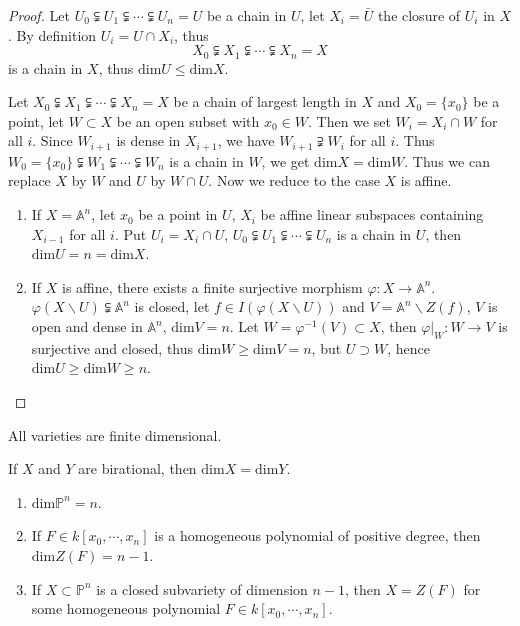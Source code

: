 \begin{proof}
	Let $ U_0\subsetneqq U_1\subsetneqq \cdots\subsetneqq U_n=U $ be a chain in $ U $, let $ X_i=\bar{U} $ the closure of $ U_i $ in $ X $. By definition $ U_i=U\cap X_i $, thus
	$$
		X_0\subsetneqq X_1\subsetneqq \cdots \subsetneqq  X_n=X
	$$
	is a chain in $ X $, thus $ \mathrm{dim}U\leq \mathrm{dim}X $.

	Let $ X_0\subsetneqq X_1\subsetneqq \cdots\subsetneqq X_n=X $ be a chain of largest length in $ X $ and $ X_0=\lbrace x_0\rbrace $ be a point, let $ W\subset X $ be an open subset with $ x_0\in W $. Then we set $ W_i=X_i\cap W $ for all $ i $. Since $ W_{i+1} $ is dense in $ X_{i+1} $, we have $ W_{i+1}\supsetneqq W_i $ for all $ i $. Thus $ W_0=\lbrace x_0\rbrace\subsetneqq W_1\subsetneqq \cdots\subsetneqq W_n $ is a chain in $ W $, we get $ \mathrm{dim}X=\mathrm{dim}W $. Thus we can replace $ X $ by $ W $ and $ U $ by $ W\cap U $. Now we reduce to the case $ X $ is affine.
	\begin{enumerate}
		\item If $ X=\mathbb{A}^n $, let $ x_0 $ be a point in $ U $, $ X_i $ be affine linear subspaces containing $ X_{i-1} $ for all $ i $. Put $ U_i=X_i\cap U $,  $ U_0\subsetneqq U_1\subsetneqq \cdots\subsetneqq U_n $ is a chain in $ U $, then $ \mathrm{dim}U=n=\mathrm{dim}X $.
		\item If $ X $ is affine, there exists a finite surjective morphism $ \varphi:X\to \mathbb{A}^n $. $ \varphi(X\backslash U)\subsetneqq \mathbb{A}^n $ is closed, let $ f\in I(\varphi(X\backslash U)) $ and $ V=\mathbb{A}^n\backslash Z(f) $, $ V $ is open and dense in $ \mathbb{A}^n $, $ \mathrm{dim}V=n $. Let $ W=\varphi^{-1}(V)\subset X $, then $ \varphi|_W:W\to V $ is surjective and closed, thus $ \mathrm{dim}W\geq \mathrm{dim}V=n $, but $ U\supset W $, hence $ \mathrm{dim}U\geq \mathrm{dim}W\geq n $.
	\end{enumerate}
\end{proof}
\begin{corollary}
	All varieties are finite dimensional.
\end{corollary}
\begin{corollary}
	If $ X $ and $ Y $ are birational, then $ \mathrm{dim}X=\mathrm{dim}Y $.
\end{corollary}
\begin{corollary}
  {}
  \noindent
	\begin{enumerate}
		\item $ \mathrm{dim}\mathbb{P}^n=n $.
		\item If $ F\in k[x_0,\cdots,x_n] $ is a homogeneous polynomial of positive degree, then $ \mathrm{dim}Z(F)=n-1 $.
		\item If $ X\subset \mathbb{P}^n $ is a closed subvariety of dimension $ n-1 $, then $ X=Z(F) $ for some homogeneous polynomial $ F\in k[x_0,\cdots,x_n] $.
	\end{enumerate}
\end{corollary}
